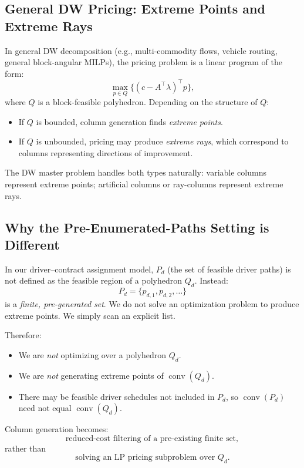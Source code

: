 \documentclass[11pt]{article}
\begin{document}
\subsection{General DW Pricing: Extreme Points and Extreme Rays}

In general DW decomposition (e.g., multi-commodity flows, vehicle routing,
general block-angular MILPs), the pricing problem is a linear program of the
form:
\[
    \max_{p \in Q} \{ (c - A^\top \lambda)^\top p \},
\]
where $Q$ is a block-feasible polyhedron.
Depending on the structure of $Q$:

\begin{itemize}
    \item If $Q$ is bounded, column generation finds \emph{extreme points}.
    \item If $Q$ is unbounded, pricing may produce \emph{extreme rays},
          which correspond to columns representing directions of improvement.
\end{itemize}

The DW master problem handles both types naturally:
variable columns represent extreme points; 
artificial columns or ray-columns represent extreme rays.

\subsection{Why the Pre-Enumerated-Paths Setting is Different}

In our driver--contract assignment model, $P_d$ (the set of feasible driver
paths) is not defined as the feasible region of a polyhedron $Q_d$.
Instead:
\[
    P_d = \{p_{d,1}, p_{d,2}, \dots\}
\]
is a \emph{finite, pre-generated set}.
We do not solve an optimization problem to produce extreme points.
We simply scan an explicit list.

Therefore:
\begin{itemize}
    \item We are \emph{not} optimizing over a polyhedron $Q_d$.
    \item We are \emph{not} generating extreme points of $\operatorname{conv}(Q_d)$.
    \item There may be feasible driver schedules not included in $P_d$, so
          $\operatorname{conv}(P_d)$ need not equal $\operatorname{conv}(Q_d)$.
\end{itemize}

Column generation becomes:
\[
    \text{reduced-cost filtering of a pre-existing finite set},
\]
rather than 
\[
    \text{solving an LP pricing subproblem over } Q_d.
\]
\end{document}
